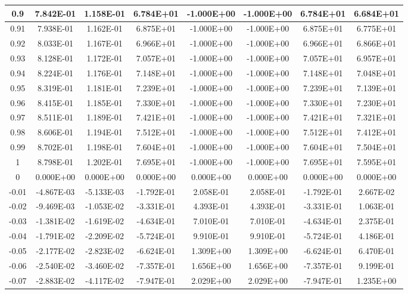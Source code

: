 \documentclass{article}
\begin{document}
\begin{center}
\begin{longtable}{|c|c|c|c|c|c|c|c|}
0.9 & 7.842E-01 & 1.158E-01 & 6.784E+01 & -1.000E+00 & -1.000E+00 & 6.784E+01 & 6.684E+01 \\ \hline
0.91 & 7.938E-01 & 1.162E-01 & 6.875E+01 & -1.000E+00 & -1.000E+00 & 6.875E+01 & 6.775E+01 \\ \hline
0.92 & 8.033E-01 & 1.167E-01 & 6.966E+01 & -1.000E+00 & -1.000E+00 & 6.966E+01 & 6.866E+01 \\ \hline
0.93 & 8.128E-01 & 1.172E-01 & 7.057E+01 & -1.000E+00 & -1.000E+00 & 7.057E+01 & 6.957E+01 \\ \hline
0.94 & 8.224E-01 & 1.176E-01 & 7.148E+01 & -1.000E+00 & -1.000E+00 & 7.148E+01 & 7.048E+01 \\ \hline
0.95 & 8.319E-01 & 1.181E-01 & 7.239E+01 & -1.000E+00 & -1.000E+00 & 7.239E+01 & 7.139E+01 \\ \hline
0.96 & 8.415E-01 & 1.185E-01 & 7.330E+01 & -1.000E+00 & -1.000E+00 & 7.330E+01 & 7.230E+01 \\ \hline
0.97 & 8.511E-01 & 1.189E-01 & 7.421E+01 & -1.000E+00 & -1.000E+00 & 7.421E+01 & 7.321E+01 \\ \hline
0.98 & 8.606E-01 & 1.194E-01 & 7.512E+01 & -1.000E+00 & -1.000E+00 & 7.512E+01 & 7.412E+01 \\ \hline
0.99 & 8.702E-01 & 1.198E-01 & 7.604E+01 & -1.000E+00 & -1.000E+00 & 7.604E+01 & 7.504E+01 \\ \hline
1 & 8.798E-01 & 1.202E-01 & 7.695E+01 & -1.000E+00 & -1.000E+00 & 7.695E+01 & 7.595E+01 \\ \hline
0 & 0.000E+00 & 0.000E+00 & 0.000E+00 & 0.000E+00 & 0.000E+00 & 0.000E+00 & 0.000E+00 \\ \hline
-0.01 & -4.867E-03 & -5.133E-03 & -1.792E-01 & 2.058E-01 & 2.058E-01 & -1.792E-01 & 2.667E-02 \\ \hline
-0.02 & -9.469E-03 & -1.053E-02 & -3.331E-01 & 4.393E-01 & 4.393E-01 & -3.331E-01 & 1.063E-01 \\ \hline
-0.03 & -1.381E-02 & -1.619E-02 & -4.634E-01 & 7.010E-01 & 7.010E-01 & -4.634E-01 & 2.375E-01 \\ \hline
-0.04 & -1.791E-02 & -2.209E-02 & -5.724E-01 & 9.910E-01 & 9.910E-01 & -5.724E-01 & 4.186E-01 \\ \hline
-0.05 & -2.177E-02 & -2.823E-02 & -6.624E-01 & 1.309E+00 & 1.309E+00 & -6.624E-01 & 6.470E-01 \\ \hline
-0.06 & -2.540E-02 & -3.460E-02 & -7.357E-01 & 1.656E+00 & 1.656E+00 & -7.357E-01 & 9.199E-01 \\ \hline
-0.07 & -2.883E-02 & -4.117E-02 & -7.947E-01 & 2.029E+00 & 2.029E+00 & -7.947E-01 & 1.235E+00 \\ \hline

\end{longtable}
\end{center}
\end{document}
